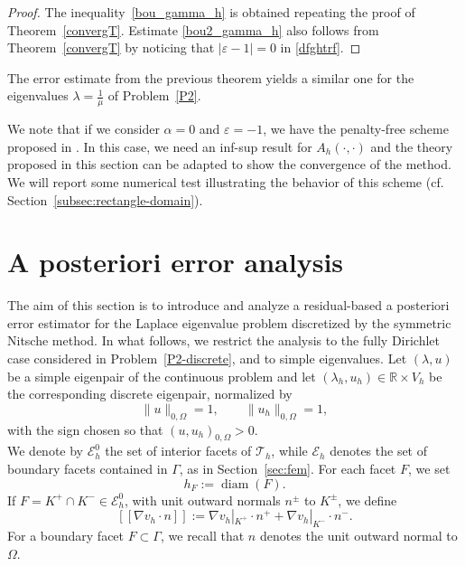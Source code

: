 \documentclass[onefignum,onetabnum,final]{siamart250211}
\numberwithin{equation}{section}
\newcommand\0{\boldsymbol{0}}
\def\l{\lambda}
\begin{document}
	\begin{proof}
		The inequality~\eqref{bou_gamma_h} is obtained repeating the proof of Theorem~\ref{convergT}.
		Estimate \eqref{bou2_gamma_h} also follows from Theorem~\ref{convergT}
		by noticing that $\vert\varepsilon-1\vert=0$ in \eqref{dfghtrf}.
	\end{proof}
	
	The error estimate from the previous theorem yields a similar one
	for the eigenvalues $\l=\frac{1}{\mu}$ of Problem~\ref{P2}.
	
	\begin{remark}\label{rem:burman-penalty-free}
		We note that if we consider $\alpha=0$ and $\varepsilon=-1$,
		we have the penalty-free scheme proposed in \cite{burman2012penalty}. In this case,
		we need an inf-sup result for $A_h(\cdot,\cdot)$ and the theory proposed in this section
		can be adapted to show the convergence of the method.
		We will report some numerical test illustrating the behavior of this scheme
		(cf. Section~\ref{subsec:rectangle-domain}).
	\end{remark}
	
		\section{A posteriori error analysis}
		\label{sec:apost}
The aim of this section is to introduce and analyze a residual-based a posteriori error estimator for the Laplace eigenvalue problem discretized by the symmetric Nitsche method. In what follows, we restrict the analysis to the fully Dirichlet case considered in Problem~\ref{P2-discrete}, and to simple eigenvalues. Let $(\lambda,u)$ be a simple eigenpair of the continuous problem and let $(\lambda_h,u_h)\in\mathbb{R}\times V_h$ be the corresponding discrete eigenpair, normalized by
\[
   \|u\|_{0,\Omega}=1,\qquad \|u_h\|_{0,\Omega}=1,
\]
with the sign chosen so that $(u,u_h)_{0,\Omega}>0$.
\\
We denote by $\mathcal E_h^0$ the set of interior facets of $\mathcal T_h$, while $\mathcal E_h$ denotes the set of boundary facets contained in $\Gamma$, as in Section~\ref{sec:fem}. For each facet $F$, we set
\[
   h_F:=\operatorname{diam}(F).
\]
If $F=K^+\cap K^-\in\mathcal E_h^0$, with unit outward normals $ n^\pm$ to $K^\pm$, we define
\[
   [\![\nabla v_h\cdot n]\!] := \nabla v_h|_{K^+}\cdot n^+  + \nabla v_h|_{K^-}\cdot n^-.
\]
For a boundary facet $F\subset\Gamma$, we recall that $ n$ denotes the unit outward normal to $\Omega$.
\end{document}
